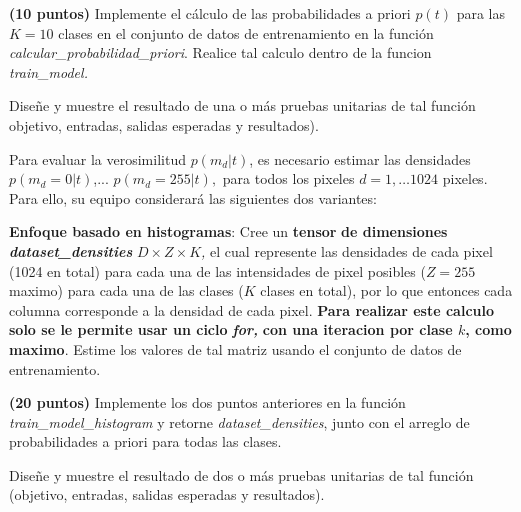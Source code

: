 \documentclass[spanish]{article}
\begin{document}
\begin{myEnumerate}
\begin{myEnumerate}
    \item \textbf{(10 puntos)} Implemente el c\'{a}lculo de las probabilidades
    a priori $p\left(t\right)$ para las $K=10$ clases en el conjunto
    de datos de entrenamiento en la funci\'{o}n \emph{calcular\_probabilidad\_priori}.
    Realice tal calculo dentro de la funcion \emph{train\_model. }
        \begin{myEnumerate}
            \item Dise\~{n}e y muestre el resultado de una o m\'{a}s pruebas unitarias
            de tal funci\'{o}n objetivo, entradas, salidas esperadas y resultados).
        \end{myEnumerate}
    
    \item Para evaluar la verosimilitud $p\left(m_{d}|t\right)$, es necesario
    estimar las densidades $p\left(m_{d}=0|t\right)$,... $p\left(m_{d}=255|t\right),$
    para todos los pixeles $d=1,\ldots1024$ pixeles. Para ello, su equipo
    considerar\'{a} las siguientes dos variantes:
        \begin{myEnumerate}
            \item \textbf{Enfoque basado en histogramas}: Cree un \textbf{tensor}\textbf{\emph{
            }}\textbf{de dimensiones }\textbf{\emph{dataset\_densities}}\textbf{
            }$D\times Z\times K$\emph{, }el cual represente las densidades de
            cada pixel (1024 en total) para cada una de las intensidades de pixel
            posibles ($Z=255$ maximo) para cada una de las clases ($K$ clases
            en total), por lo que entonces cada columna corresponde a la densidad
            de cada pixel. \textbf{Para realizar este calculo solo se le permite
            usar un ciclo }\textbf{\emph{for, }}\textbf{con una iteracion por
            clase $k$, como maximo}. Estime los valores de tal matriz usando
            el conjunto de datos de entrenamiento.
        \begin{myEnumerate}
            \item \textbf{(20 puntos)} Implemente los dos puntos anteriores en la funci\'{o}n \emph{train\_model\_histogram }y retorne \emph{dataset\_densities}, junto con el arreglo de probabilidades a priori para todas las clases.
            \begin{myEnumerate}
                \item Dise\~{n}e y muestre el resultado de dos o m\'{a}s pruebas unitarias
                de tal funci\'{o}n (objetivo, entradas, salidas esperadas y resultados).

\end{myEnumerate}
\end{myEnumerate}
\end{myEnumerate}
\end{myEnumerate}
\end{myEnumerate}
\end{document}

